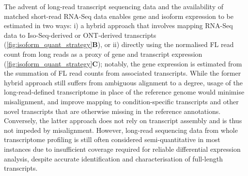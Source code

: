 The advent of long-read transcript sequencing data and the availability of matched short-read RNA-Seq data enables gene and isoform expression to be estimated in two ways: i) a hybrid approach that involves mapping RNA-Seq data to Iso-Seq-derived or ONT-derived transcripts (\cref{fig:isoform_quant_strategy}\textbf{B}), or ii) directly using the normalised FL read count from long reads as a proxy of gene and transcript expression (\cref{fig:isoform_quant_strategy}\textbf{C}); notably, the gene expression is estimated from the summation of FL read counts from associated transcripts. While the former hybrid approach still suffers from ambiguous alignment to a degree, usage of the long-read-defined transcriptome in place of the reference genome would minimise misalignment, and improve mapping to condition-specific transcripts and other novel transcripts that are otherwise missing in the reference annotations\cite{Au2013}. Conversely, the latter approach does not rely on transcript assembly and is thus not impeded by misalignment. However, long-read sequencing data from whole transcriptome profiling is still often considered semi-quantitative in most instances due to insufficient coverage required for reliable differential expression analysis, despite accurate identification and characterisation of full-length transcripts.  

